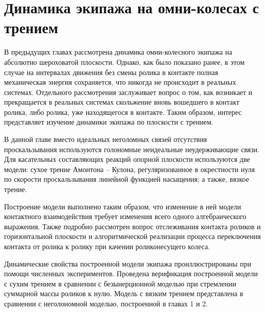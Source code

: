 \chapter{Динамика экипажа на омни-колесах с трением}


В предыдущих главах рассмотрена динамика омни-колесного экипажа на абсолютно шероховатой плоскости. Однако, как было показано ранее, в этом случае на интервалах движения без смены ролика в контакте полная механическая энергия сохраняется, что никогда не происходит в реальных системах.
Отдельного рассмотрения заслуживает вопрос о том, как возникает и прекращается в реальных системах скольжение вновь вошедшего в контакт ролика, либо ролика, уже находящегося в контакте.
Таким образом, интерес представляет изучение динамики экипажа по плоскости с трением.

В данной главе вместо идеальных неголомных связей отсутствия проскальзывания используются голономные неидеальные неудерживающие связи. Для касательных составляющих реакций опорной плоскости используются две модели: сухое трение Амонтона -- Кулона, регуляризованное в окрестности нуля по скорости проскальзывания линейной функцией насыщения; а также, вязкое трение.

Построение модели выполнено таким образом, что изменение в ней модели контактного взаимодействия требует изменения всего одного алгебраического выражения. Также подробно рассмотрен вопрос отслеживания контакта роликов и горизонтальной плоскости и алгоритмической реализации процесса переключения контакта от ролика к ролику при качении  роликонесущего колеса.

Динамические свойства построенной модели экипажа проиллюстрированы при помощи численных экспериментов. Проведена верификация построенной модели с сухим трением в сравнении с безынерционной моделью при стремлении суммарной массы роликов к нулю. Модель с вязким трением представлена в сравнении с неголономной моделью, построенной в главах 1 и 2.
